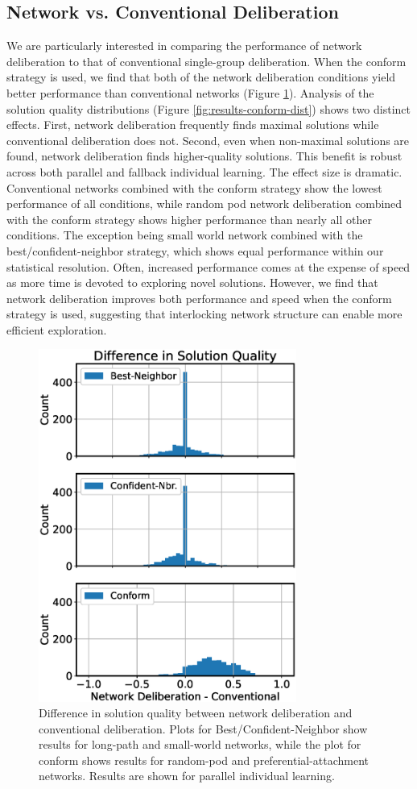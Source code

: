 \subsection{Network vs. Conventional Deliberation}
We are particularly interested in comparing the performance of network deliberation to that of conventional single-group deliberation. When the conform strategy is used, we find that both of the network deliberation conditions yield better performance than conventional networks (Figure \ref{fig:results-conform-diff}). Analysis of the solution quality distributions (Figure \ref{fig:results-conform-dist}) shows two distinct effects. First, network deliberation frequently finds maximal solutions while conventional deliberation does not. Second, even when non-maximal solutions are found, network deliberation finds higher-quality solutions. This benefit is robust across both parallel and fallback individual learning. The effect size is dramatic. Conventional networks combined with the conform strategy show the lowest performance of all conditions, while random pod network deliberation combined with the conform strategy shows higher performance than nearly all other conditions. The exception being small world network combined with the best/confident-neighbor strategy, which shows equal performance within our statistical resolution. 
Often, increased performance comes at the expense of speed as more time is devoted to exploring novel solutions. However, we find that network deliberation improves both performance and speed when the conform strategy is used, suggesting that interlocking network structure can enable more efficient exploration.

\begin{figure}
    \label{fig:results-conform-diff}
    \centering
    \includegraphics[width=3.33in]{fig/NetDelibABM/fig-results-netdelib-diff.eps}
\caption{Difference in solution quality between network deliberation and conventional deliberation. Plots for Best/Confident-Neighbor show results for long-path and small-world networks, while the plot for conform shows results for random-pod and preferential-attachment networks. Results are shown for parallel individual learning.}
\end{figure}

